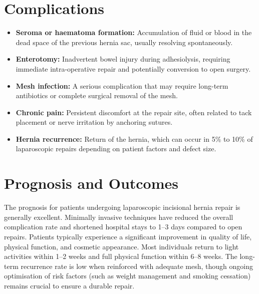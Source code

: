 \section*{Complications}
\begin{itemize}
    \item \textbf{Seroma or haematoma formation:} Accumulation of fluid or blood in the dead space of the previous hernia sac, usually resolving spontaneously.
    \item \textbf{Enterotomy:} Inadvertent bowel injury during adhesiolysis, requiring immediate intra-operative repair and potentially conversion to open surgery.
    \item \textbf{Mesh infection:} A serious complication that may require long-term antibiotics or complete surgical removal of the mesh.
    \item \textbf{Chronic pain:} Persistent discomfort at the repair site, often related to tack placement or nerve irritation by anchoring sutures.
    \item \textbf{Hernia recurrence:} Return of the hernia, which can occur in 5\% to 10\% of laparoscopic repairs depending on patient factors and defect size.
\end{itemize}

\section*{Prognosis and Outcomes}
The prognosis for patients undergoing laparoscopic incisional hernia repair is generally excellent. Minimally invasive techniques have reduced the overall complication rate and shortened hospital stays to 1--3 days compared to open repairs. Patients typically experience a significant improvement in quality of life, physical function, and cosmetic appearance. Most individuals return to light activities within 1--2 weeks and full physical function within 6--8 weeks. The long-term recurrence rate is low when reinforced with adequate mesh, though ongoing optimisation of risk factors (such as weight management and smoking cessation) remains crucial to ensure a durable repair.

